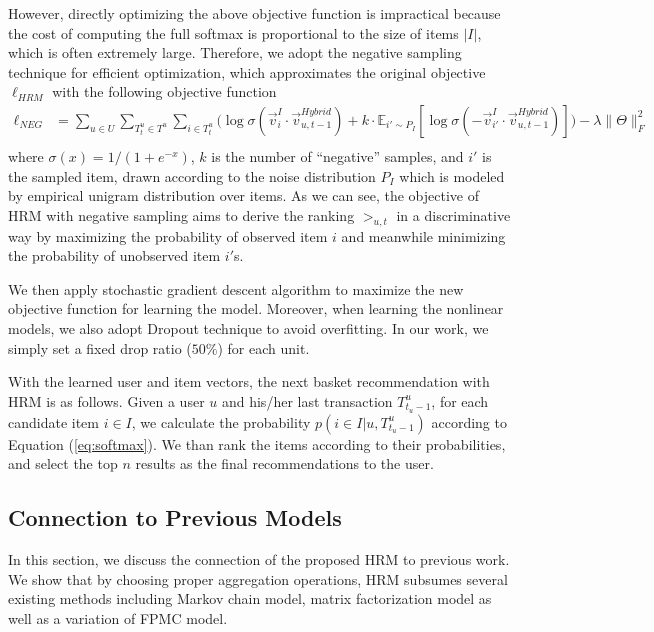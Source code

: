 \documentclass[10pt,journal,compsoc]{IEEEtran}
\begin{document}
However, directly optimizing the above objective function is impractical because the cost of computing the full softmax is proportional to the size of items $|I|$, which is often extremely large. Therefore, we adopt the negative sampling technique \cite{mikolov2014,mikolov2013} for efficient optimization, which approximates the original objective $\ell_{HRM}$ with the following objective function
\begin{displaymath}
    \begin{aligned}
  \ell_{NEG} &= \sum_{u\in U}\sum_{T^u_t\in T^u} \sum_{i\in T^u_t}\Big( \log\sigma(\vec{v}^I_i\cdot\vec{v}^{Hybrid}_{u,t-1})+k\cdot \mathbb{E}_{i'\sim P_I}[\log\sigma(-\vec{v}^I_{i'}\cdot\vec{v}^{Hybrid}_{u,t-1})]\Big) -\lambda\|\Theta\|^2_F\\
   \end{aligned}
\end{displaymath}
where $\sigma(x)=1/(1+e^{-x})$, $k$ is the number of ``negative'' samples, and $i'$ is the sampled item, drawn according to the noise distribution $P_I$ which is modeled by empirical unigram distribution over items. As we can see, the objective of HRM with negative sampling aims to derive the ranking $>_{u,t}$ in a discriminative way by maximizing the probability of observed item $i$ and meanwhile minimizing the probability of unobserved item $i'$s.

We then apply stochastic gradient descent algorithm to maximize the new objective function for learning the model. Moreover, when learning the nonlinear models, we also adopt Dropout technique to avoid overfitting. In our work, we simply set a fixed drop ratio ($50\%$) for each unit.

With the learned user and item vectors, the next basket recommendation with HRM is as follows. Given a user $u$ and his/her last transaction $T_{t_u-1}^u$, for each candidate item $i\in I$, we calculate the probability $p(i\in I|u,T^u_{t_u-1})$ according to Equation (\ref{eq:softmax}). We than rank the items according to their probabilities, and select the top $n$ results as the final recommendations to the user.

\subsection{Connection to Previous Models}
In this section, we discuss the connection of the proposed HRM to previous work. We show that by choosing proper aggregation operations, HRM subsumes several existing methods including Markov chain model, matrix factorization model as well as a variation of FPMC model.
\end{document}
